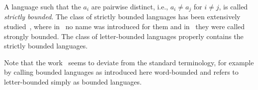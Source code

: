 A language such that the $a_i$ are pairwise distinct, i.e., $a_i \ne a_j$
 for $i \ne j$, is called \emph{strictly bounded}.
 The class of strictly bounded languages has been extensively studied~\cite{DBLP:journals/mst/BlattnerC77,DBLP:journals/dam/DassowP99,Ginsburg66,GinsburgSpanier64,GinsburgSpanier66,HerrmannKMW17},
 where in~\cite{Ginsburg66,GinsburgSpanier64,GinsburgSpanier66} no name was introduced for them
 and in~\cite{HerrmannKMW17} they were called strongly bounded.
 The class of letter-bounded languages properly contains the strictly bounded languages.
 
 \begin{toappendix} 
 Note that the work~\cite{HerrmannKMW17}
 seems to deviate from the standard terminology, for example by calling bounded languages
 as introduced here word-bounded and refers to letter-bounded simply as bounded languages.
 \end{toappendix}
 

